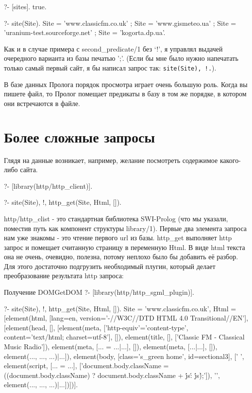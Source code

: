 \documentclass[a4paper]{book}
\begin{document}
\begin{example}{}{}
?- [sites].
true.

?- site(Site).
Site = 'www.classicfm.co.uk' ;
Site = 'www.gismeteo.ua' ;
Site = 'uranium-test.sourceforge.net' ;
Site = 'kogorta.dp.ua'.
\end{example}

Как и в случае примера с second_predicate/1 без `!', я управлял
выдачей очередного варианта из базы печатью ';'. (Если бы мне
было нужно напечатать только самый первый сайт, я бы написал
запрос так: \verb|site(Site), !.|). 

В базе данных Пролога порядок просмотра играет очень большую
роль. Когда вы пишете файл, то Пролог помещает предикаты в базу в
том же порядке, в котором они встречаются в файле.

\section{Более сложные запросы}

Глядя на данные возникает, например, желание посмотреть
содержимое какого-либо сайта.

\begin{example}{}{}
?- [library(http/http_client)].

?- site(Site), !, http_get(Site, Html, []).
\end{example}

http/http_clist - это стандартная библиотека SWI-Prolog (что мы
указали, поместив путь как компонент структуры library/1). Первые
два элемента запроса нам уже знакомы - это чтение первого url из
базы.  http_get выполняет http запрос и помещает считанную
страницу в переменную Html. В виде html текста она не очень,
очевидно, полезна, потому неплохо было бы добавить её разбор. Для
этого достаточно подгрузить необходимый плугин, который делает
преобразование результата http запроса:

\begin{example}{Получение DOM}{GetDOM}
?- [library(http/http_sgml_plugin)].                  

?- site(Site), !, http_get(Site, Html, []).
Site = 'www.classicfm.co.uk',
Html = [element(html, [lang=en, version='-//W3C//DTD HTML 4.0 Transitional//EN'], [element(head, [], [element(meta, ['http-equiv'='content-type', content='text/html; charset=utf-8'], []), element(title, [], ['Classic FM - Classical Music Radio']), element(meta, [... = ...|...], []), element(meta, [...|...], []), element(..., ..., ...)|...]), element(body, [class='s_green home', id=sectional3], ['    ', element(script, [... = ...], ['document.body.className = ((document.body.className) ? document.body.className + \'js\' : \'js\');']), '\n    \n    \n    ', element(..., ..., ...)|...])])].                                                      
\end{example}
\end{document}
